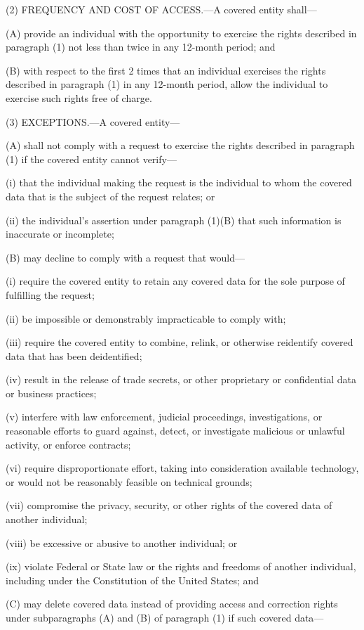 (2) FREQUENCY AND COST OF ACCESS.—A covered entity shall—

(A) provide an individual with the opportunity to exercise the rights described in paragraph (1) not less than twice in any 12-month period; and

(B) with respect to the first 2 times that an individual exercises the rights described in paragraph (1) in any 12-month period, allow the individual to exercise such rights free of charge.

(3) EXCEPTIONS.—A covered entity—

(A) shall not comply with a request to exercise the rights described in paragraph (1) if the covered entity cannot verify—

(i) that the individual making the request is the individual to whom the covered data that is the subject of the request relates; or

(ii) the individual’s assertion under paragraph (1)(B) that such information is inaccurate or incomplete;

(B) may decline to comply with a request that would—

(i) require the covered entity to retain any covered data for the sole purpose of fulfilling the request;

(ii) be impossible or demonstrably impracticable to comply with;

(iii) require the covered entity to combine, relink, or otherwise reidentify covered data that has been deidentified;

(iv) result in the release of trade secrets, or other proprietary or confidential data or business practices;

(v) interfere with law enforcement, judicial proceedings, investigations, or reasonable efforts to guard against, detect, or investigate malicious or unlawful activity, or enforce contracts;

(vi) require disproportionate effort, taking into consideration available technology, or would not be reasonably feasible on technical grounds;

(vii) compromise the privacy, security, or other rights of the covered data of another individual;

(viii) be excessive or abusive to another individual; or

(ix) violate Federal or State law or the rights and freedoms of another individual, including under the Constitution of the United States; and

(C) may delete covered data instead of providing access and correction rights under subparagraphs (A) and (B) of paragraph (1) if such covered data—

